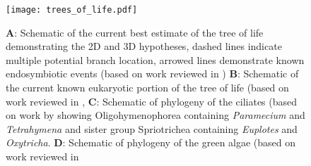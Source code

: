 %
%
%
%
%
%
%
%
%





 



\begin{figure}
    \texttt{[image: trees\_of\_life.pdf]}
    \caption[Taxonomic Context of Host and Endosymbiont]{\textbf{A}: Schematic of the current best estimate of the tree of life demonstrating the 2D and 3D hypotheses,
dashed lines indicate multiple potential branch location, arrowed lines demonstrate known endosymbiotic events (based on work reviewed in \citep{Gribaldo2010})
\textbf{B}: Schematic of the current known eukaryotic portion of the tree of life (based on work reviewed in \citep{Burki2014,Adl2013},
\textbf{C}: Schematic of phylogeny of the ciliates (based on work by \citep{Bachvaroff2011} showing Oligohymenophorea containing \textit{Paramecium} and \textit{Tetrahymena} and sister group Spriotrichea containing \textit{Euplotes} and \textit{Oxytricha}.
\textbf{D}: Schematic of phylogeny of the green algae (based on work reviewed in \citep{Leliaert2012}}
    \label{fig:tol}
\end{figure}

